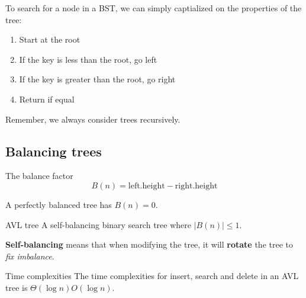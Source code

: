 To search for a node in a BST, we can simply captialized on the properties of the tree:
\begin{enumerate}
    \item Start at the root
    \item If the key is less than the root, go left
    \item If the key is greater than the root, go right
    \item Return if equal
\end{enumerate}
Remember, we always consider trees recursively.

\subsection{Balancing trees}

\begin{knBox}
    {The balance factor}
    \[B(n)=\text{left.height} - \text{right.height}\]

    A perfectly balanced tree has $B(n)=0$.
\end{knBox}

\begin{definition}
    {AVL tree}
    A self-balancing binary search tree where $|{B(n)}|\leq 1$.

    \textbf{Self-balancing} means that when modifying the tree, it will \textbf{rotate} the tree to \textit{fix imbalance}.
\end{definition}

\begin{theorem}
    {Time complexities}
    The time complexities for insert, search and delete in an AVL tree is $\Theta(\log n) O(\log n)$.
\end{theorem}

